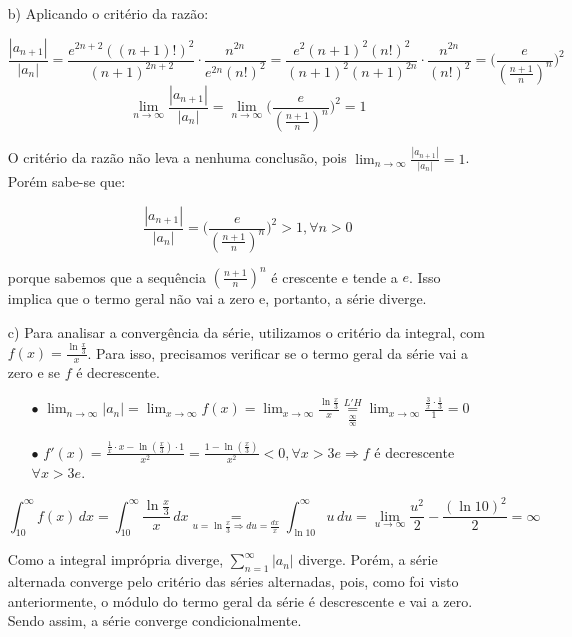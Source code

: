 \documentclass[12pt,a4paper]{article}
\begin{document}
\begin{itemize}
\item[b)] Aplicando o critério da razão:

$$ \frac{|a_{n+1}|}{|a_n|} =  \frac{e^{2n+2}((n+1)!)^2}{(n+1)^{2n+2}} \cdot  \frac{n^{2n}}{e^{2n} (n!)^2} =  \frac{e^{2}(n+1)^2 (n!)^2}{(n+1)^{2} (n+1)^{2n}} \cdot  \frac{n^{2n}}{ (n!)^2} = \Bigg( \frac{e}{(\frac{n+1}{n})^n} \Bigg)^2 $$
$$\lim_{n\rightarrow\infty} \frac{|a_{n+1}|}{|a_n|} = \lim_{n\rightarrow\infty} \Bigg( \frac{e}{(\frac{n+1}{n})^n} \Bigg)^2 = 1 $$

O critério da razão não leva a nenhuma conclusão, pois $\displaystyle\lim_{n\rightarrow\infty} \frac{|a_{n+1}|}{|a_n|} = 1 $. Porém sabe-se que:

$$ \frac{|a_{n+1}|}{|a_n|} = \Bigg( \frac{e}{(\frac{n+1}{n})^n} \Bigg)^2 > 1, \forall n > 0 $$

porque sabemos que a sequência $(\frac{n+1}{n})^n$ é crescente e tende a $e$. Isso implica que o termo geral não vai a zero e, portanto, a série diverge.

\item[c)] Para analisar a convergência da série, utilizamos o critério da integral, com $f(x) = \frac{\ln \frac{x}{3}}{x}$. Para isso, precisamos verificar se o termo geral da série vai a zero e se $f$ é decrescente.
    
    \begin{itemize}
    \item[$\bullet$] $\displaystyle\lim_{n \rightarrow \infty} |a_n| = \lim_{x \rightarrow \infty} f(x) = \lim_{x \rightarrow \infty} \frac{\ln \frac{x}{3}}{x} \underset{\frac{\infty}{\infty}}{ \overset{L'H}{=}} \lim_{x \rightarrow \infty} \frac{\frac{3}{x} \cdot \frac{1}{3}}{1} = 0$
    \item[$\bullet$] $f'(x) = \frac{\frac{1}{x} \cdot x - \ln(\frac{x}{3}) \cdot 1}{x^2} = \frac{1 - \ln(\frac{x}{3})}{x^2} < 0, \forall x > 3e  \Rightarrow f$ é decrescente $\forall x > 3e$.
    \end{itemize}
    
    $$ \int_{10}^\infty f(x) \, dx = \int_{10}^\infty \frac{\ln \frac{x}{3}}{x}  \, dx \underset{u = \ln \frac{x}{3} \Rightarrow du = \frac{dx}{x} }{=} \int_{\ln 10}^\infty u  \, du = \lim_{u\rightarrow\infty} \frac{u^2}{2} - \frac{(\ln 10)^2}{2} = \infty $$
    
    Como a integral imprópria diverge, $\displaystyle\sum_{n=1}^\infty |a_n|$ diverge. Porém, a série alternada converge pelo critério das séries alternadas, pois, como foi visto anteriormente, o módulo do termo geral da série é descrescente e vai a zero. Sendo assim, a série converge condicionalmente.

\end{itemize}
\end{document}
